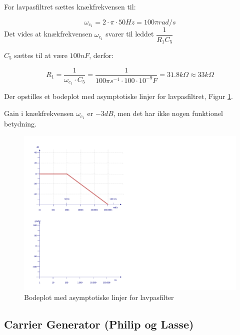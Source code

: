 For lavpasfiltret sættes knækfrekvensen til:

\begin{displaymath}
\omega_{c_{1}}=2\cdot \pi \cdot 50Hz = 100\pi rad/s
\end{displaymath}
Det vides at knækfrekvensen $\omega_{c_{1}}$ svarer til leddet $\dfrac{1}{R_{1}C_{5}}$


$C_{5}$ sættes til at være $100nF$, derfor:

\begin{displaymath}
R_{1}= \dfrac{1}{\omega_{c_{1}}\cdot C_{5}} =
\dfrac{1}{100\pi s^{-1} \cdot 100\cdot 10^{-9}F} =
31.8k\Omega \approx 33k\Omega
\end{displaymath}

Der opstilles et bodeplot med asymptotiske linjer for lavpasfiltret, Figur \ref{fig:BodePlotLPF}.

Gain i knækfrekvensen $\omega_{c_{1}}$ er $-3dB$, men det har ikke nogen funktionel betydning.

\begin{figure}[h]
	\centering
	\includegraphics[scale=0.6, trim=50 430 590 50, clip=true]{../HardwareDesign/Diagrammer/BodePlotLPF.pdf}
	\caption{Bodeplot med asymptotiske linjer for lavpasfilter}
	\label{fig:BodePlotLPF}
\end{figure}

\newpage

\subsection{Carrier Generator (Philip og Lasse)} \label{subSecCarrierGen}


